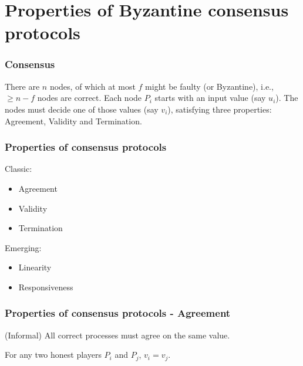 \documentclass{beamer}
\begin{document}

\section{Properties of Byzantine consensus protocols}


\begin{frame}
\frametitle{Consensus}


\begin{definition}[Consensus]
There are $n$ nodes, of which at most $f$ might be faulty (or Byzantine), i.e., $\geq n-f$ nodes are correct.
Each node $P_i$ starts with an input value (say $u_i$).
The nodes must decide one of those values (say $v_i$), satisfying three properties: Agreement, Validity and Termination.
\end{definition}

\end{frame}

\begin{frame}
    \frametitle{Properties of consensus protocols}

    Classic:

    \begin{itemize}
        \item Agreement
        \item Validity
        \item Termination
    \end{itemize}

    Emerging:

    \begin{itemize}
        \item Linearity
        \item Responsiveness
    \end{itemize}

\end{frame}

\begin{frame}
\frametitle{Properties of consensus protocols - Agreement}

(Informal) All correct processes must agree on the same value.

\begin{definition}[Agreement]
For any two honest players $P_i$ and $P_j$, $v_i = v_j$.
\end{definition}

\end{frame}
\end{document}
